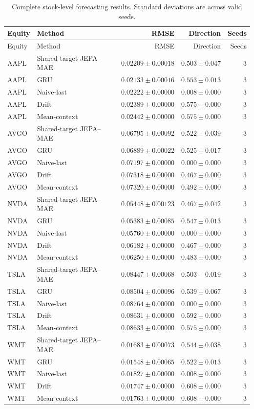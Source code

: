 \begin{longtable}{llrrr}
\caption{Complete stock-level forecasting results. Standard deviations are across valid seeds.}\label{tab:appendix_stock_metrics}\\
\toprule
Equity & Method & RMSE & Direction & Seeds \\
\midrule
\endfirsthead
\toprule
Equity & Method & RMSE & Direction & Seeds \\
\midrule
\endhead
AAPL & Shared-target JEPA--MAE & $0.02209 \pm 0.00018$ & $0.503 \pm 0.047$ & 3 \\
AAPL & GRU & $0.02133 \pm 0.00016$ & $0.553 \pm 0.013$ & 3 \\
AAPL & Naive-last & $0.02222 \pm 0.00000$ & $0.008 \pm 0.000$ & 3 \\
AAPL & Drift & $0.02389 \pm 0.00000$ & $0.575 \pm 0.000$ & 3 \\
AAPL & Mean-context & $0.02442 \pm 0.00000$ & $0.575 \pm 0.000$ & 3 \\
AVGO & Shared-target JEPA--MAE & $0.06795 \pm 0.00092$ & $0.522 \pm 0.039$ & 3 \\
AVGO & GRU & $0.06889 \pm 0.00022$ & $0.525 \pm 0.017$ & 3 \\
AVGO & Naive-last & $0.07197 \pm 0.00000$ & $0.000 \pm 0.000$ & 3 \\
AVGO & Drift & $0.07318 \pm 0.00000$ & $0.467 \pm 0.000$ & 3 \\
AVGO & Mean-context & $0.07320 \pm 0.00000$ & $0.492 \pm 0.000$ & 3 \\
NVDA & Shared-target JEPA--MAE & $0.05448 \pm 0.00123$ & $0.467 \pm 0.042$ & 3 \\
NVDA & GRU & $0.05383 \pm 0.00085$ & $0.547 \pm 0.013$ & 3 \\
NVDA & Naive-last & $0.05760 \pm 0.00000$ & $0.000 \pm 0.000$ & 3 \\
NVDA & Drift & $0.06182 \pm 0.00000$ & $0.467 \pm 0.000$ & 3 \\
NVDA & Mean-context & $0.06250 \pm 0.00000$ & $0.483 \pm 0.000$ & 3 \\
TSLA & Shared-target JEPA--MAE & $0.08447 \pm 0.00068$ & $0.503 \pm 0.019$ & 3 \\
TSLA & GRU & $0.08504 \pm 0.00096$ & $0.539 \pm 0.067$ & 3 \\
TSLA & Naive-last & $0.08764 \pm 0.00000$ & $0.000 \pm 0.000$ & 3 \\
TSLA & Drift & $0.08631 \pm 0.00000$ & $0.592 \pm 0.000$ & 3 \\
TSLA & Mean-context & $0.08633 \pm 0.00000$ & $0.575 \pm 0.000$ & 3 \\
WMT & Shared-target JEPA--MAE & $0.01683 \pm 0.00073$ & $0.544 \pm 0.038$ & 3 \\
WMT & GRU & $0.01548 \pm 0.00065$ & $0.522 \pm 0.013$ & 3 \\
WMT & Naive-last & $0.01827 \pm 0.00000$ & $0.008 \pm 0.000$ & 3 \\
WMT & Drift & $0.01747 \pm 0.00000$ & $0.608 \pm 0.000$ & 3 \\
WMT & Mean-context & $0.01763 \pm 0.00000$ & $0.608 \pm 0.000$ & 3 \\
\bottomrule
\end{longtable}
